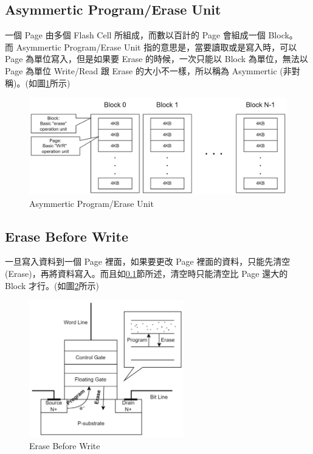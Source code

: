 \subsection{Asymmertic Program/Erase Unit}\label{s2.1.2}
\indent
一個 Page 由多個 Flash Cell 所組成，而數以百計的 Page 會組成一個 Block。\\
而 Asymmertic Program/Erase Unit 指的意思是，當要讀取或是寫入時，可以 Page 為單位寫入，但是如果要 Erase 的時候，一次只能以 Block 為單位，無法以 Page 為單位 Write/Read 跟 Erase 的大小不一樣，所以稱為 Asymmertic (非對稱)。(如圖\ref{f2.1}所示)
\begin{figure}[H]
    \centering
    \includegraphics[width=1\textwidth]{picture/ch2/Asymmertic_P-E_unit.png}
    \caption{Asymmertic Program/Erase Unit}
    \label{f2.1}
\end{figure}

\subsection{Erase Before Write}\label{s2.1.3}
\indent
一旦寫入資料到一個 Page 裡面，如果要更改 Page 裡面的資料，只能先清空(Erase)，再將資料寫入。而且如\ref{s2.1.2}節所述，清空時只能清空比 Page 還大的 Block 才行。(如圖\ref{f2.2}所示)\cite{SRFTL}
\begin{figure}[H]
    \centering
    \includegraphics[width=0.6\textwidth]{picture/ch2/erase_before_write.png}
    \caption{Erase Before Write}
    \label{f2.2}
\end{figure}

